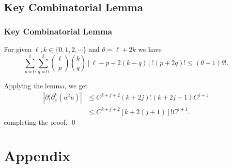 \documentclass{beamer}
\numberwithin{equation}{section}
\begin{document}
\subsection{Key Combinatorial Lemma}
\begin{frame}
  \frametitle{Key Combinatorial Lemma}
  \begin{lemma}
For given $\ell, k\in \{0,1,2,\cdots\}$ and  $\theta=\ell+ 2k$ we have
%
\begin{equation*}
\label{key-in} \sum_{p=0}^{\ell}
\sum_{q=0}^{k}\binom{\ell}{p}\binom{k}{q}[\ell-p+2(k-q)]!
(p+2 q)!\le (\theta+1)\theta!.
\end{equation*}
%
\end{lemma}
\end{frame}
%
%
\begin{frame}
Applying the lemma, we get 
\begin{equation*}
\label{meq7}
\begin{split}
\left \vert \partial_t^j\partial_x^k (u^2\overline{u})\right \vert
&\le C^{k+j + 2}(k+2j)!
(k+2j+1)C^{j+1}\\
&\le C^{k+j+2}[k+2(j+1)]! C^{j+1}.
\end{split}
\end{equation*}
%
completing the proof. \qed
\end{frame}
\section{Appendix}
\end{document}
